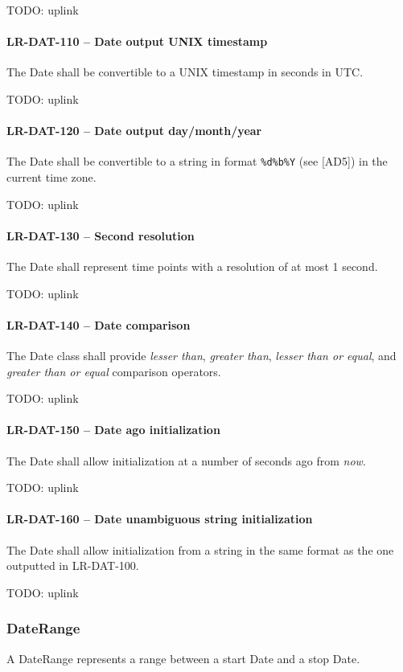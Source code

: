 TODO: uplink
\paragraph{LR-DAT-110 -- Date output UNIX timestamp}
The Date shall be convertible to a UNIX timestamp in seconds in \gls{UTC}.

TODO: uplink
\paragraph{LR-DAT-120 -- Date output day/month/year}
The Date shall be convertible to a string in format
\lstinline{%d%b%Y} (see [AD5]) in the current time zone.

TODO: uplink
\paragraph{LR-DAT-130 -- Second resolution}
The Date shall represent time points with a resolution of at most 1 second.

TODO: uplink

\paragraph{LR-DAT-140 -- Date comparison}
The Date class shall provide \emph{lesser than}, \emph{greater than},
\emph{lesser than or equal}, and \emph{greater than or equal} comparison
operators.

TODO: uplink

\paragraph{LR-DAT-150 -- Date ago initialization}
The Date shall allow initialization at a number of seconds ago from
\emph{now}.

TODO: uplink

\paragraph{LR-DAT-160 -- Date unambiguous string initialization}
The Date shall allow initialization from a string in the
same format as the one outputted in LR-DAT-100.

TODO: uplink

\subsubsection{DateRange}
A DateRange represents a range between a start Date and a stop Date.

